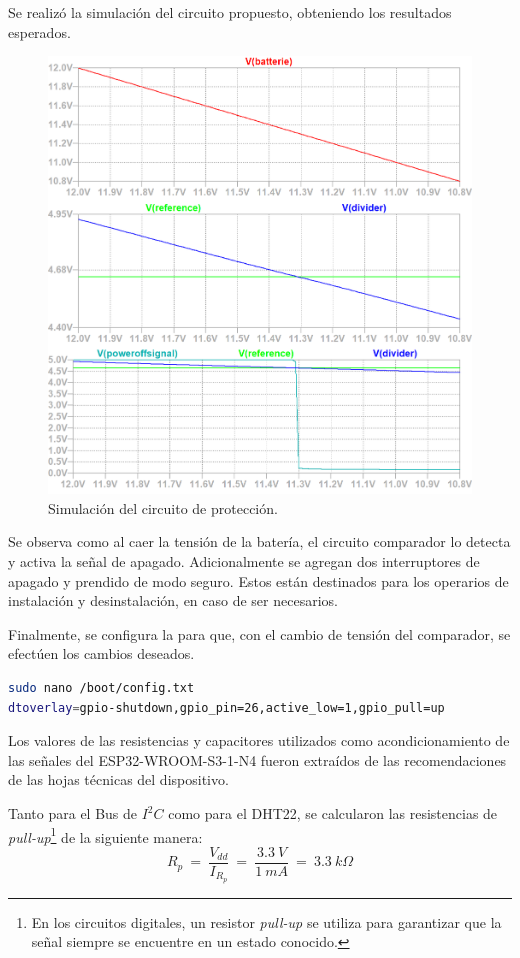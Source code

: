 Se realizó la simulación del circuito propuesto, obteniendo los resultados esperados.
\begin{figure}[H]
	\centering
    \includegraphics[width=0.9\linewidth]{ImagenesIngenieria de Detalle/Simulation}	
	\caption{Simulación del circuito de protección.}
	\label{fig:sim}
\end{figure}

Se observa como al caer la tensión de la batería, el circuito comparador lo detecta y activa la señal de apagado. Adicionalmente se agregan dos interruptores de apagado y prendido de modo seguro. Estos están destinados para los operarios de instalación y desinstalación, en caso de ser necesarios.

Finalmente, se configura la \rspi para que, con el cambio de tensión del comparador, se efectúen los cambios deseados.
\begin{lstlisting}[language=bash]
sudo nano /boot/config.txt 
dtoverlay=gpio-shutdown,gpio_pin=26,active_low=1,gpio_pull=up
\end{lstlisting} 

Los valores de las resistencias y capacitores utilizados como acondicionamiento de las señales del ESP32-WROOM-S3-1-N4 fueron extraídos de las recomendaciones de las hojas técnicas del dispositivo.

Tanto para el Bus de $I^2C$ como para el DHT22, se calcularon las resistencias de \textit{pull-up}\footnote{En los circuitos digitales, un resistor \textit{pull-up} se utiliza para garantizar que la señal siempre se encuentre en un estado conocido.} de la siguiente manera:
\begin{equation}
	R_p \ = \  \frac{V_{dd}}{I_{R_p}} \ = \ \frac{3.3 \ V}{1 \ mA} \ = \ 3.3 \ k\Omega  
\end{equation}

